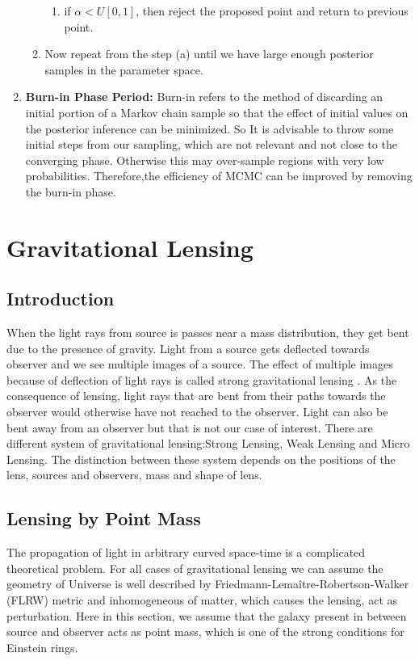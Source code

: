 \documentclass[12pt]{report}
\begin{document}
\begin{enumerate}
\begin{enumerate}
\begin{enumerate}
\item
if $\alpha<U[0,1]$, then reject the proposed point and return to previous point.
\end{enumerate}
\item
Now repeat from the step (a) until we have large enough posterior samples in the parameter space.
\end{enumerate}
\item
\textbf{Burn-in Phase Period:} Burn-in refers to the method of discarding an initial portion of a Markov chain sample so that the effect of initial values on the posterior inference can be  minimized.  So It is advisable to throw some initial steps from our sampling, which are not relevant and not close to the converging phase. Otherwise this may over-sample regions with very low probabilities. Therefore,the efficiency of MCMC can be improved by removing the burn-in phase. \\
\end{enumerate}
\chapter{Gravitational Lensing}
\section{Introduction}
When the light rays from source is passes near a mass distribution, they get bent due to the presence of gravity. Light from a source gets deflected towards observer and we see multiple images of a source. The effect of multiple images because of deflection of light rays is called strong gravitational lensing \cite{rn1996,sl1992}. As the consequence of lensing, light rays that are bent from their paths towards the observer would otherwise have not reached to the observer. Light can also be bent away from an observer but that is not our case of interest. There are different system of gravitational lensing:Strong Lensing, Weak Lensing and Micro Lensing. The distinction between these system depends on the positions of the lens, sources and observers, mass and shape of lens.
\section{Lensing by Point Mass}
The propagation of light in arbitrary curved space-time is a complicated theoretical problem. For all cases of gravitational lensing we can assume the geometry of Universe is well described by Friedmann-Lema\^itre-Robertson-Walker (FLRW) metric and inhomogeneous of matter, which causes the lensing, act as perturbation. Here in this section, we assume that the galaxy present in between source and observer acts as point mass, which is one of the strong conditions for Einstein rings.
\end{document}
